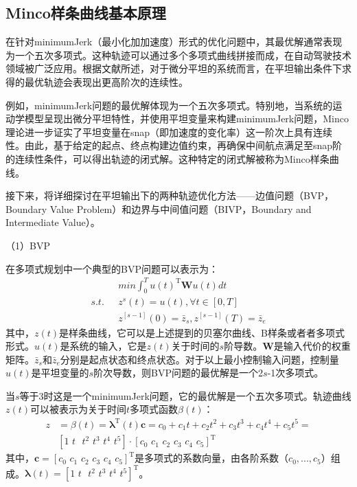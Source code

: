 \documentclass[master,academic]{ysuthesis} %
\begin{document}
		\subsection{Minco样条曲线基本原理}
		在针对minimumJerk（最小化加加速度）形式的优化问题中，其最优解通常表现为一个五次多项式。这种轨迹可以通过多个多项式曲线拼接而成，在自动驾驶技术领域被广泛应用。根据文献\cite{wang2022geometrically}所述，对于微分平坦的系统而言，在平坦输出条件下求得的最优轨迹会表现出更高阶次的连续性。
		
		例如，minimumJerk问题的最优解体现为一个五次多项式。特别地，当系统的运动学模型呈现出微分平坦特性，并使用平坦变量来构建minimumJerk问题，Minco理论进一步证实了平坦变量在snap（即加速度的变化率）这一阶次上具有连续性。由此，基于给定的起点、终点构建边值约束，再确保中间航点满足至snap阶的连续性条件，可以得出轨迹的闭式解。这种特定的闭式解被称为Minco样条曲线。

		接下来，将详细探讨在平坦输出下的两种轨迹优化方法——边值问题（BVP，Boundary Value Problem）和边界与中间值问题（BIVP，Boundary and Intermediate Value）。

		\newpage
		\vspace*{-1.5em}

		（1）BVP

		在多项式规划中一个典型的BVP问题可以表示为：
		\begin{equation}
			\begin{aligned}
				&min\int_0^T{u}(t) ^{\mathrm{T}}\bm{W}u(t) dt\\
				s.t. \ \ \ &z^s(t) =u(t) ,\forall t\in \left[ 0,T \right] \\
				&z^{\left[ s-1 \right]}(0) =\bar{z}_s,z^{\left[ s-1 \right]}(T) =\bar{z}_e
			\end{aligned}
		\end{equation}
		其中，$z(t)$是样条曲线，它可以是上述提到的贝塞尔曲线、B样条或者者多项式形式。$u(t)$是系统的输入，它是$z(t)$关于时间的$s$阶导数。$\bm{W}$是输入代价的权重矩阵。$\bar{z}_s$和$\bar{z}_e$分别是起点状态和终点状态。对于以上最小控制输入问题，控制量$u(t)$是平坦变量的$s$阶次导数，则BVP问题的最优解是一个2$s$-1次多项式。

		当$s$等于3时这是一个minimumJerk问题，它的最优解是一个五次多项式。轨迹曲线$z(t)$可以被表示为关于时间$t$多项式函数$\beta(t)$：
		\begin{equation}
			\begin{aligned}
				z&=\beta (t) =\bm{\lambda} ^{\mathrm{T}}(t) \bm{c} =c_0+c_1t+c_2t^2+c_3t^3+c_4t^4+c_5t^5=\\
				&\left[ 1\,\,t\,\,\,\,t^2\,\,t^3\,\,t^4\,\,t^5 \right] \cdot \left[ c_0\,\,c_1\,\,c_2\,\,c_3\,\,c_4\,\,c_5 \right] ^{\mathrm{T}}
			\end{aligned}
		\end{equation}
		其中，$\bm{c}=\left[ c_0\,\,c_1\,\,c_2\,\,c_3\,\,c_4\,\,c_5 \right] ^{\mathrm{T}}$是多项式的系数向量，由各阶系数（$c_0,...,c_5$）组成。$\bm{\lambda}(t)=\left[ 1\,\,t\,\,\,\,t^2\,\,t^3\,\,t^4\,\,t^5 \right]^{\mathrm{T}}$。
		
\end{document}
